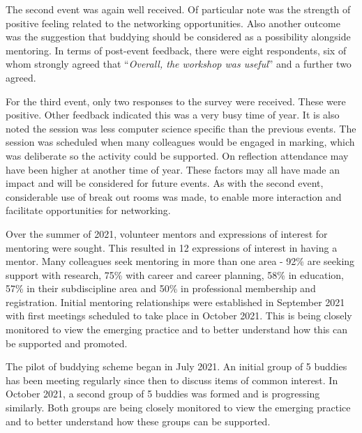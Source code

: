 \documentclass[sigconf]{acmart}
\begin{document}
The second event was again well received. Of particular note was the
strength of positive feeling related to the networking
opportunities. Also another outcome was the suggestion that buddying
should be considered as a possibility alongside mentoring. In terms of
post-event feedback, there were eight respondents, six of whom
strongly agreed that ``{\emph{Overall, the workshop was useful}}'' and
a further two agreed.

For the third event, only two responses to the survey were
received. These were positive. Other feedback indicated this was a
very busy time of year. It is also noted the session was less computer
science specific than the previous events. The session was scheduled
when many colleagues would be engaged in marking, which was deliberate
so the activity could be supported. On reflection attendance may have
been higher at another time of year. These factors may all have made
an impact and will be considered for future events. As with the second
event, considerable use of break out rooms was made, to enable more
interaction and facilitate opportunities for networking.

\begin{comment}
TO DO - evaluation of Mentoring - PH what is needed here? Is sufficient to indicate the first pilot of 10 Mentees has been established? Or do we need feedback from the participants?
\end{comment}

Over the summer of 2021, volunteer mentors and expressions of interest for mentoring were sought. This resulted in 12 expressions of interest in having a mentor. Many colleagues seek mentoring in more than one area - 92\% are seeking support with research, 75\% with career and career planning, 58\% in education, 57\% in their subdiscipline area and 50\% in professional membership and registration. Initial mentoring relationships were established in September 2021 with first meetings scheduled to take place in October 2021. This is being closely monitored to view the emerging practice and to better understand how this can be supported and promoted.

\begin{comment}
To DO - evaluation of Buddying - PH what is needed here? Is sufficient to indicate the first pilot of 10 buddies has been established? Or do we need feedback from the participants?
\end{comment}

The pilot of buddying scheme began in July 2021. An initial group of 5
buddies has been meeting regularly since then to discuss items of
common interest. In October 2021, a second group of 5 buddies was
formed and is progressing similarly. Both groups are being closely
monitored to view the emerging practice and to better understand how
these groups can be supported.
\end{document}
